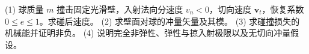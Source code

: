 (1) 球质量 \(m\) 撞击固定光滑壁，入射法向分速度 \(v_n<0\)，切向速度 \(\mathbf v_t\)，恢复系数 \(0\le e\le1\)。求碰后速度。
(2) 求壁面对球的冲量矢量及其模。
(3) 求碰撞损失的机械能并证明非负。
(4) 说明完全非弹性、弹性与掠入射极限以及无切向冲量假设。
